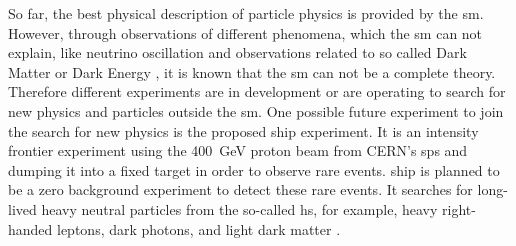 So far, the best physical description of particle physics is provided by the \ac{sm}.
However, through observations of different phenomena, which the \ac{sm} can not explain, like neutrino oscillation \cite{Fukuda_1998,Troitsky_2012} and observations related to so called Dark Matter or Dark Energy \cite{Troitsky_2012}, it is known that the \ac{sm} can not be a complete theory.
Therefore different experiments are in development or are operating to search for new physics and particles outside the \ac{sm}.
One possible future experiment to join the search for new physics is the proposed \ac{ship} experiment.
It is an intensity frontier experiment using the \SI{400}{\giga\electronvolt} proton beam from CERN's \ac{sps} and dumping it into a fixed target in order to observe rare events.
\ac{ship} is planned to be a zero background experiment to detect these rare events.
It searches for long-lived heavy neutral particles from the so-called \ac{hs}, for example, heavy right-handed leptons, dark photons, and light dark matter \cite{instrumentation}.

